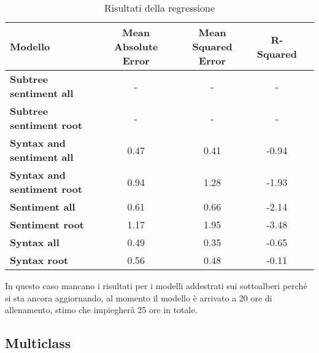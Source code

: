 \begin{table}[H]
    \centering
    \begin{tabular}{|l|c|c|c|c|}
    \hline
    \textbf{Modello} & \textbf{Mean Absolute Error} & \textbf{Mean Squared
    Error} & \textbf{R-Squared} \\
    \hline
    \textbf{Subtree sentiment all} & - & - & - \\
    \textbf{Subtree sentiment root} & - & - & - \\
    \hline

    \textbf{Syntax and sentiment all} & 0.47 & 0.41 & -0.94 \\
    \textbf{Syntax and sentiment root} & 0.94 & 1.28 & -1.93 \\
    \hline

    \textbf{Sentiment all} & 0.61 & 0.66 & -2.14 \\
    \textbf{Sentiment root} & 1.17 & 1.95 & -3.48 \\
    \hline

    \textbf{Syntax all} & 0.49 & 0.35 & -0.65 \\
    \textbf{Syntax root} & 0.56 & 0.48 & -0.11 \\
    \hline
    \end{tabular}
    \caption{Risultati della regressione}
\end{table}

In questo caso mancano i risultati per i modelli addestrati sui sottoalberi
perché si sta ancora aggiornando, al momento il modello è arrivato a 20 ore di
allenamento, stimo che impiegherà 25 ore in totale.

\subsection{Multiclass}

